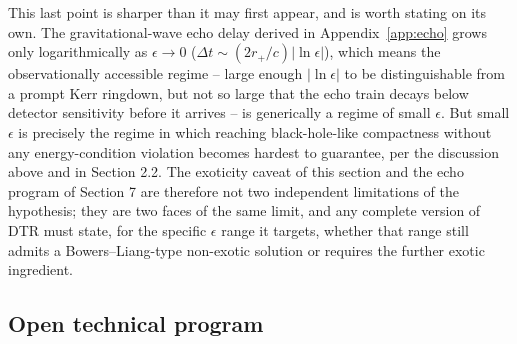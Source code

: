 \documentclass[11pt]{article}
\begin{document}
This last point is sharper than it may first appear, and is worth stating on its own. The gravitational-wave echo delay derived in Appendix~\ref{app:echo} grows only logarithmically as $\epsilon\to0$ ($\Delta t \sim (2r_+/c)|\ln\epsilon|$), which means the observationally accessible regime -- large enough $|\ln\epsilon|$ to be distinguishable from a prompt Kerr ringdown, but not so large that the echo train decays below detector sensitivity before it arrives -- is generically a regime of small $\epsilon$. But small $\epsilon$ is precisely the regime in which reaching black-hole-like compactness without any energy-condition violation becomes hardest to guarantee, per the discussion above and in Section 2.2. The exoticity caveat of this section and the echo program of Section 7 are therefore not two independent limitations of the hypothesis; they are two faces of the same limit, and any complete version of DTR must state, for the specific $\epsilon$ range it targets, whether that range still admits a Bowers--Liang-type non-exotic solution or requires the further exotic ingredient.

\subsection{Open technical program}
\end{document}
